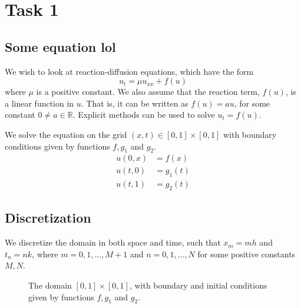 \section{Task 1}

\subsection{Some equation lol}

We wish to look at reaction-diffusion equations, which have the form
\begin{equation}
    \label{eq:original_eq}
     u_t = \mu u_{xx} + f(u)
\end{equation}
where $\mu$ is a positive constant.
We also assume that the reaction term,
$f(u)$, is a linear function in \( u \).
That is, it can be written as \( f(u) = au \),
for some constant \( 0 \neq a \in \mathbb{R} \).
Explicit methods can be used to solve $u_t = f(u)$.

We solve the equation on
the grid \( (x, t) \in [0, 1] \times [0, 1] \)
with boundary conditions given by functions
\( f, g_1 \) and \( g_2 \).
\begin{align*}
  u(0, x) &= f(x) \\
  u(t, 0) &= g_1(t) \\
  u(t, 1) &= g_2(t)
\end{align*}

\subsection{Discretization}

We discretize the domain in both space and time,
such that $x_m = mh$ and $t_n = nk$,
where \( m = 0, 1, \dots, M + 1\) and \( n = 0, 1, \dots, N \)
for some positive constants \( M, N \).

\begin{figure}[!h]
\centering
\label{fig:disc}
\caption{The domain \( [0, 1] \times [0, 1] \), with boundary and initial conditions
given by functions \( f, g_1 \) and \( g_2 \).}
\end{figure}

